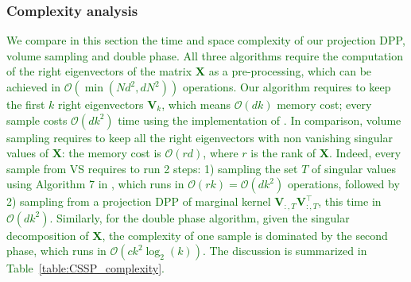 \documentclass[twoside,11pt]{book}
\newcommand{\rev}[1]{\textcolor{darkgreen}{#1}}
\numberwithin{theorem}{chapter}
\numberwithin{definition}{chapter}
\numberwithin{proposition}{chapter}
\numberwithin{corollary}{chapter}
\numberwithin{example}{chapter}
\numberwithin{lemma}{chapter}
\DeclareMathOperator{\Tran}{\intercal}
\begin{document}
\subsubsection{Complexity analysis}\label{sec:complexity}
\rev{We compare in this section the time and space complexity of our projection DPP, volume sampling and double phase.
All three algorithms require the computation of the right eigenvectors of the matrix $\bm{X}$ as a pre-processing, which can be achieved in $\mathcal{O}(\min(N d^{2},dN^{2}))$ operations.
Our algorithm requires to keep the first $k$ right eigenvectors $\bm{V}_{k}$, which means $\mathcal{O}(dk)$ memory cost; every sample costs $\mathcal{O}(dk^{2})$ time using the implementation of \cite{TrBaAm18}.}
\rev{In comparison, volume sampling requires to keep all the right eigenvectors with non vanishing singular values of $\bm{X}$: the memory cost is $\mathcal{O}(r d)$, where $r$ is the rank of $\bm{X}$.
Indeed, every sample from VS requires to run 2 steps: 1) sampling the set $T$ of singular values using Algorithm 7 in \citep{KuTa12}, which runs in $\mathcal{O}(rk) = \mathcal{O}(dk^{2})$ operations, followed by 2) sampling from a projection DPP of marginal kernel $\bm{V}_{:,T}^{\phantom{\Tran}}\bm{V}_{:,T}^{\Tran}$, this time in $\mathcal{O}(dk^{2})$.
%
Similarly, for the double phase algorithm, given the singular decomposition of $\bm{X}$, the complexity of one sample is dominated by the second phase, which runs in $\mathcal{O}(c k^{2} \log_{2}(k))$. The discussion is summarized in Table~\ref{table:CSSP_complexity}.}
\end{document}

